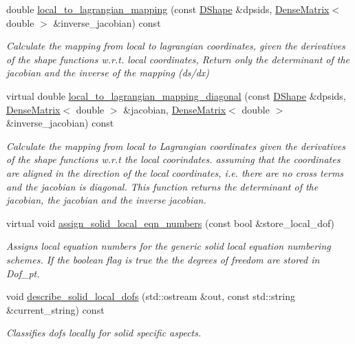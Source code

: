 \begin{DoxyCompactItemize}
double \hyperlink{classoomph_1_1SolidFiniteElement_afa4031c891a8a86fa27e2339ff923ebc}{local\+\_\+to\+\_\+lagrangian\+\_\+mapping} (const \hyperlink{classoomph_1_1DShape}{D\+Shape} \&dpsids, \hyperlink{classoomph_1_1DenseMatrix}{Dense\+Matrix}$<$ double $>$ \&inverse\+\_\+jacobian) const
\begin{DoxyCompactList}\small\item\em Calculate the mapping from local to lagrangian coordinates, given the derivatives of the shape functions w.\+r.\+t. local coordinates, Return only the determinant of the jacobian and the inverse of the mapping (ds/dx) \end{DoxyCompactList}\item 
virtual double \hyperlink{classoomph_1_1SolidFiniteElement_a811c926ab4ec81ecb374030302ef28ca}{local\+\_\+to\+\_\+lagrangian\+\_\+mapping\+\_\+diagonal} (const \hyperlink{classoomph_1_1DShape}{D\+Shape} \&dpsids, \hyperlink{classoomph_1_1DenseMatrix}{Dense\+Matrix}$<$ double $>$ \&jacobian, \hyperlink{classoomph_1_1DenseMatrix}{Dense\+Matrix}$<$ double $>$ \&inverse\+\_\+jacobian) const
\begin{DoxyCompactList}\small\item\em Calculate the mapping from local to Lagrangian coordinates given the derivatives of the shape functions w.\+r.\+t the local coorindates. assuming that the coordinates are aligned in the direction of the local coordinates, i.\+e. there are no cross terms and the jacobian is diagonal. This function returns the determinant of the jacobian, the jacobian and the inverse jacobian. \end{DoxyCompactList}\item 
virtual void \hyperlink{classoomph_1_1SolidFiniteElement_a3c7ad30f234e87649ed34cea94f65ea3}{assign\+\_\+solid\+\_\+local\+\_\+eqn\+\_\+numbers} (const bool \&store\+\_\+local\+\_\+dof)
\begin{DoxyCompactList}\small\item\em Assigns local equation numbers for the generic solid local equation numbering schemes. If the boolean flag is true the the degrees of freedom are stored in Dof\+\_\+pt. \end{DoxyCompactList}\item 
void \hyperlink{classoomph_1_1SolidFiniteElement_a1892091d7e876725a70b34cd5d91b861}{describe\+\_\+solid\+\_\+local\+\_\+dofs} (std\+::ostream \&out, const std\+::string \&current\+\_\+string) const
\begin{DoxyCompactList}\small\item\em Classifies dofs locally for solid specific aspects. \end{DoxyCompactList}\item 

\end{DoxyCompactItemize}
